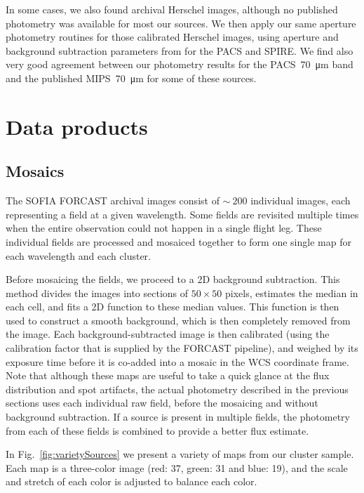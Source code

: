 In some cases, we also found archival Herschel images, although no published photometry was available for most our sources. We then apply our same aperture photometry routines for those calibrated Herschel images, using aperture and background subtraction parameters from \citep{Shimizu:2016if} for the PACS and SPIRE. We find also very good agreement between our photometry results for the PACS~\SI{70}{\um} band and the published \Spitzer MIPS~\SI{70}{\um} for some of these sources. %

\section{Data products}

\subsection{Mosaics}
The SOFIA FORCAST archival images consist of $\sim~200$ individual images, each representing a field at a given wavelength. Some fields are revisited multiple times when the entire observation could not happen in a single flight leg. These individual fields are processed and mosaiced together to form one single map for each wavelength and each cluster. 

Before mosaicing the fields, we proceed to a 2D background subtraction. This method divides the images into sections of $50\times 50$ pixels, estimates the median in each cell, and fits a 2D function to these median values. This function is then used to construct a smooth background, which is then completely removed from the image. Each background-subtracted image is then calibrated (using the calibration factor that is supplied by the FORCAST pipeline), and weighed by its exposure time before it is co-added into a mosaic in the WCS coordinate frame. Note that although these maps are useful to take a quick glance at the flux distribution and spot artifacts, the actual photometry described in the previous sections uses each individual raw field, before the mosaicing and without background subtraction. If a source is present in multiple fields, the photometry from each of these fields is combined to provide a better flux estimate.

In Fig.~\ref{fig:varietySources} we present a variety of maps from our cluster sample. Each map is a three-color image (red: \SI{37}{\micron}, green: \SI{31}{\micron} and blue: \SI{19}{\micron}), and the scale and stretch of each color is adjusted to balance each color. 

